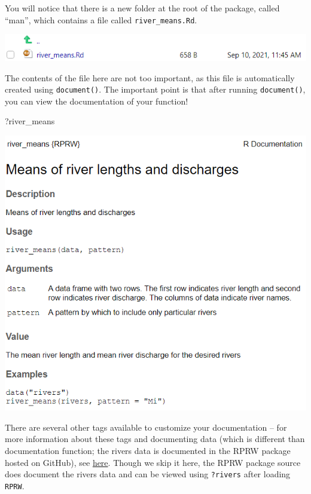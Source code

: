 \documentclass[
]{book}
\newenvironment{Shaded}{\begin{snugshade}}{\end{snugshade}}
\newcommand{\NormalTok}[1]{#1}
\begin{document}
You will notice that there is a new folder at the root of the package, called ``man'', which contains a file called \texttt{river\_means.Rd}.

\includegraphics[width=1\linewidth]{images/newrpack_files2}

The contents of the file here are not too important, as this file is automatically created using \texttt{document()}. The important point is that after running \texttt{document()}, you can view the documentation of your function!

\begin{Shaded}
\begin{Highlighting}[]
\NormalTok{?river_means}
\end{Highlighting}
\end{Shaded}

\includegraphics[width=1\linewidth]{images/newrpack_example}

There are several other tags available to customize your documentation -- for more information about these tags and documenting data (which is different than documentation function; the rivers data is documented in the RPRW package hosted on GitHub), see \href{https://r-pkgs.org/man.html\#man}{here}. Though we skip it here, the RPRW package source does document the rivers data and can be viewed using \texttt{?rivers} after loading \texttt{RPRW}.
\end{document}
